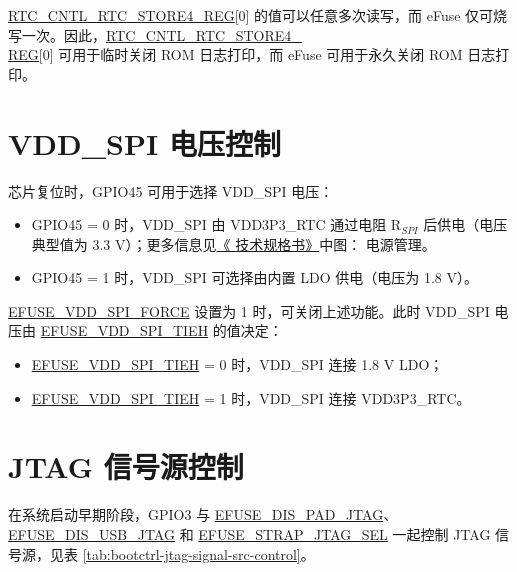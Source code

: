 \documentclass[main\_\_CN.tex]{subfiles}
\begin{document}
\vspace{-1em}
\begin{tiplisting}
\hyperref[regdesc:RTCCNTLRTCSTORE4REG]{RTC\_CNTL\_RTC\_STORE4\_REG}[0] 的值可以任意多次读写，而 eFuse 仅可烧写一次。因此，\hyperref[regdesc:RTCCNTLRTCSTORE4REG]{RTC\_CNTL\_RTC\_STORE4\_\\REG}[0] 可用于临时关闭 ROM 日志打印，而 eFuse 可用于永久关闭 ROM 日志打印。
\end{tiplisting}

\section{VDD\_SPI 电压控制}

芯片复位时，GPIO45 可用于选择 VDD\_SPI 电压：

\begin{itemize}
    \item GPIO45 = 0 时，VDD\_SPI 由 VDD3P3\_RTC 通过电阻 R$_{SPI}$ 后供电（电压典型值为 3.3 V）；更多信息见\href{https://www.espressif.com/sites/default/files/documentation/esp32-s3_datasheet_cn.pdf}{《\chipname{} 技术规格书》}中图：\chipname{} 电源管理。
    \item GPIO45 = 1 时，VDD\_SPI 可选择由内置 LDO 供电（电压为 1.8 V）。
\end{itemize}

\hyperref[fielddesc:EFUSEVDDSPIFORCE]{EFUSE\_VDD\_SPI\_FORCE} 设置为 1 时，可关闭上述功能。此时 VDD\_SPI 电压由 \hyperref[fielddesc:EFUSEVDDSPITIEH]{EFUSE\_VDD\_SPI\_TIEH} 的值决定：

\begin{itemize}
    \item \hyperref[fielddesc:EFUSEVDDSPITIEH]{EFUSE\_VDD\_SPI\_TIEH} = 0 时，VDD\_SPI 连接 1.8 V LDO；
    \item \hyperref[fielddesc:EFUSEVDDSPITIEH]{EFUSE\_VDD\_SPI\_TIEH} = 1 时，VDD\_SPI 连接 VDD3P3\_RTC。
\end{itemize}

\section{JTAG 信号源控制}

在系统启动早期阶段，GPIO3 与 \hyperref[fielddesc:EFUSEDISPADJTAG]{EFUSE\_DIS\_PAD\_JTAG}、\hyperref[fielddesc:EFUSEDISUSBJTAG]{EFUSE\_DIS\_USB\_JTAG} 和 \hyperref[fielddesc:EFUSESTRAPJTAGSEL]{EFUSE\_STRAP\_JTAG\_SEL} 一起控制 JTAG 信号源，见表 \ref{tab:bootctrl-jtag-signal-src-control}。
\end{document}

